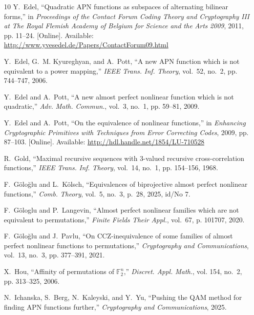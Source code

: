 \documentclass{amsart}[11pt]
\theoremstyle{plain}
\theoremstyle{definition}
\numberwithin{theorem}{section}
\numberwithin{equation}{section}
\numberwithin{table}{section}
\numberwithin{figure}{section}
\numberwithin{algorithm}{section}
\begin{document}
\begin{thebibliography}{10}
\BIBentryALTinterwordspacing
Y.~Edel, ``Quadratic {APN} functions as subspaces of alternating bilinear forms,'' in \emph{Proceedings of the Contact Forum Coding Theory and Cryptography III at The Royal Flemish Academy of Belgium for Science and the Arts 2009}, 2011, pp. 11--24. [Online]. Available: \url{http://www.yvesedel.de/Papers/ContactForum09.html}
\BIBentrySTDinterwordspacing

Y.~Edel, G.~M. Kyureghyan, and A.~Pott, ``A new {APN} function which is not equivalent to a power mapping,'' \emph{{IEEE} Trans. Inf. Theory}, vol.~52, no.~2, pp. 744--747, 2006.

Y.~Edel and A.~Pott, ``A new almost perfect nonlinear function which is not quadratic,'' \emph{Adv. Math. Commun.}, vol.~3, no.~1, pp. 59--81, 2009.

\BIBentryALTinterwordspacing
Y.~Edel and A.~Pott, ``On the equivalence of nonlinear functions,'' in \emph{Enhancing Cryptographic Primitives with Techniques from Error Correcting Codes}, 2009, pp. 87--103. [Online]. Available: \url{http://hdl.handle.net/1854/LU-710528}
\BIBentrySTDinterwordspacing

R.~Gold, ``Maximal recursive sequences with 3-valued recursive cross-correlation functions,'' \emph{{IEEE} Trans. Inf. Theory}, vol.~14, no.~1, pp. 154--156, 1968.

F.~G{\"o}lo{\u{g}}lu and L.~K{\"o}lsch, ``Equivalences of biprojective almost perfect nonlinear functions,'' \emph{Comb. Theory}, vol.~5, no.~3, p.~28, 2025, id/No 7.

F.~G{\"{o}}loglu and P.~Langevin, ``Almost perfect nonlinear families which are not equivalent to permutations,'' \emph{Finite Fields Their Appl.}, vol.~67, p. 101707, 2020.

F.~G{\"o}lo{\u g}lu and J.~Pavlu, ``On {CCZ}-inequivalence of some families of almost perfect nonlinear functions to permutations,'' \emph{Cryptography and Communications}, vol.~13, no.~3, pp. 377--391, 2021.

X.~Hou, ``Affinity of permutations of {$\mathbb{F}_2^n$},'' \emph{Discret. Appl. Math.}, vol. 154, no.~2, pp. 313--325, 2006.

N.~Ichanska, S.~Berg, N.~Kaleyski, and Y.~Yu, ``Pushing the {QAM} method for finding {APN} functions further,'' \emph{Cryptography and Communications}, 2025.


\end{thebibliography}
\end{document}
